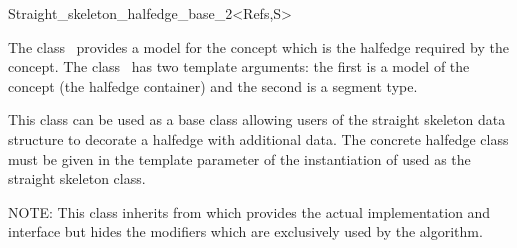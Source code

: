 

\begin{ccRefClass}{Straight_skeleton_halfedge_base_2<Refs,S>}


\ccDefinition

The class \ccRefName\ provides a model for the
 concept which is the halfedge
required by the 
concept. The class \ccRefName\ has two template arguments: the first is
a model of the  concept (the halfedge container) and the second is
a segment type.

This class can be used as a base class allowing users of the straight skeleton data structure to decorate a halfedge with additional data. The concrete halfedge class must be given in the  template parameter of the instantiation of  used as the straight skeleton class.

NOTE: This class inherits from  which provides the actual implementation and interface but hides the modifiers which are exclusively used by the algorithm.


\ccIsModel
{}\\
\\
\\
\\

\ccSeeAlso
{}\\
\\
\\
\\
\end{ccRefClass}


